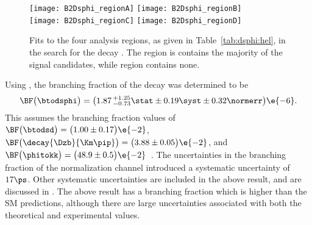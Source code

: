 \begin{figure}
  \begin{center}
    \texttt{[image: B2Dsphi\_regionA]}
    \texttt{[image: B2Dsphi\_regionB]}\\
    \texttt{[image: B2Dsphi\_regionC]}
    \texttt{[image: B2Dsphi\_regionD]}
    \caption[Fits to \btodsphi data]
    {\small
      Fits to the four analysis regions, as given in Table~\ref{tab:dsphi:hel}, in the search for
      the decay \btodsphi.
      The region \rA is contains the majority of the signal candidates, while region \rD contains
      none.
    }
    \label{fig:dsphi:fits}
  \end{center}
\end{figure}

Using , the branching fraction of the decay \btodsphi was determined to be
\begin{equation}
  \BF\big(\btodsphi\big) =
  \big(1.87\,^{+1.25}_{-0.73}\stat\pm0.19\syst\pm0.32\normerr\big)\e{-6}.
  \label{eq:dsphi:result}
\end{equation}
This assumes the branching fraction values of
$\BF\big(\btodsd\big)=\big(1.00\pm0.17\big)\e{-2}$,
$\BF\big(\decay{\Dzb}{\Km\pip}\big)=\big(3.88\pm0.05\big)\e{-2}$, and
$\BF\big(\phitokk\big)=\big(48.9\pm0.5\big)\e{-2}$~\cite{PDG2012}.
The uncertainties in the branching fraction of the normalization channel introduced a systematic
uncertainty of $17\ps$.
Other systematic uncertainties are included in the above result, and are discussed in
.
The above result has a branching fraction which is higher than the SM predictions, although there
are large uncertainties associated with both the theoretical and experimental values.





